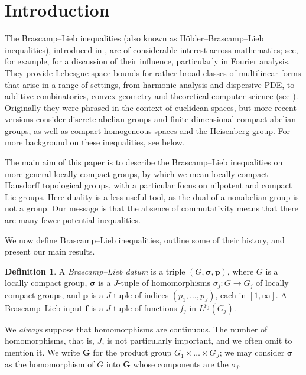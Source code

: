 \documentclass[12pt,twoside,a4paper]{amsart}
\theoremstyle{definition}
\newtheorem{defn}[thm]{Definition}%
\theoremstyle{remark}
\numberwithin{equation}{section}
\newcommand{\bsf}{\boldsymbol{f}}
\newcommand{\bss}{\boldsymbol{\sigma}}
\newcommand{\bsp}{\boldsymbol{p}}
\newcommand{\bsG}{\boldsymbol{G}}
\begin{document}
\maketitle




\section{Introduction}
The Brascamp--Lieb inequalities (also known as Hölder--Brascamp--Lieb inequalities), introduced in \cite{BL76}, are of considerable interest across mathematics; see, for example, \cite{BB21, BCCT08, Zh22}  for a discussion of their influence, particularly in Fourier analysis. 
They provide Lebesgue space bounds for rather broad classes of multilinear forms that arise in a range of settings, from harmonic analysis and dispersive PDE, to additive combinatorics, convex geometry and theoretical computer science (see \cite{CDKSY24}). 
Originally they were phrased in the context of euclidean spaces, but more recent versions consider discrete abelian groups and finite-dimensional compact abelian groups, as well as compact homogeneous spaces and the Heisenberg group. 
For more background on these inequalities, see below.

The main aim of this paper is to describe the Brascamp--Lieb inequalities on more general locally compact groups, by which we mean locally compact Hausdorff topological groups, with a particular focus on nilpotent and compact Lie groups. 
Here duality is a less useful tool, as the dual of a nonabelian group is not a group.
Our message is that the absence of commutativity means that there are many fewer potential inequalities.

We now define Brascamp--Lieb inequalities, outline some of their history, and present our main results. 


\begin{defn}%
A \emph{Brascamp--Lieb datum} is a triple $(G, \bss,\bsp)$, where $G$ is a locally compact group, $\bss$ is a $J$-tuple of homomorphisms $\sigma_j\colon G\to  G_j$ of locally compact groups, and $\bsp$ is a $J$-tuple of indices $(p_1,\dots ,p_J)$, each in $[1,\infty]$. 
A Brascamp--Lieb input $\bsf$ is a $J$-tuple of functions $f_j$ in $L^{p_j}(G_j)$.
\end{defn}

We \emph{always} suppose that homomorphisms are continuous.
The number of homomorphisms, that is, $J$, is not particularly important, and we often omit to mention it.
We write $\bsG$ for the product group $G_1 \times \dots \times G_J$; we may consider $\bss$ as the homomorphism of $G$ into $\bsG$ whose components are the $\sigma_j$. 
\end{document}
